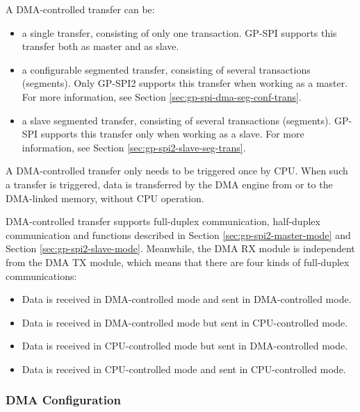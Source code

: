 \documentclass[main\_\_EN.tex]{subfiles}
\begin{document}
A DMA-controlled transfer can be:

\begin{itemize}
    \item a single transfer, consisting of only one transaction. GP-SPI supports this transfer both as master and as slave.
    \item a configurable segmented transfer, consisting of several transactions (segments). Only GP-SPI2 supports this transfer when working as a master. For more information, see Section \ref{sec:gp-spi-dma-seg-conf-trans}.
    \item a slave segmented transfer, consisting of several transactions (segments). GP-SPI supports this transfer only when working as a slave. For more information, see Section \ref{sec:gp-spi2-slave-seg-trans}.
\end{itemize}

A DMA-controlled transfer only needs to be triggered once by CPU. When such a transfer is triggered, data is transferred by the DMA engine from or to the DMA-linked memory, without CPU operation.

DMA-controlled transfer supports full-duplex communication, half-duplex communication and functions described in Section \ref{sec:gp-spi2-master-mode} and Section \ref{sec:gp-spi2-slave-mode}. Meanwhile, the DMA RX module is independent from the DMA TX module, which means that there are four kinds of full-duplex communications:

\begin{itemize}
    \item Data is received in DMA-controlled mode and sent in DMA-controlled mode.

    \item Data is received in DMA-controlled mode but sent in CPU-controlled mode.

    \item Data is received in CPU-controlled mode but sent in DMA-controlled mode.

    \item Data is received in CPU-controlled mode and sent in CPU-controlled mode.

\end{itemize}

\subsubsection{DMA Configuration}\label{sec:DMA-conf}
\end{document}
